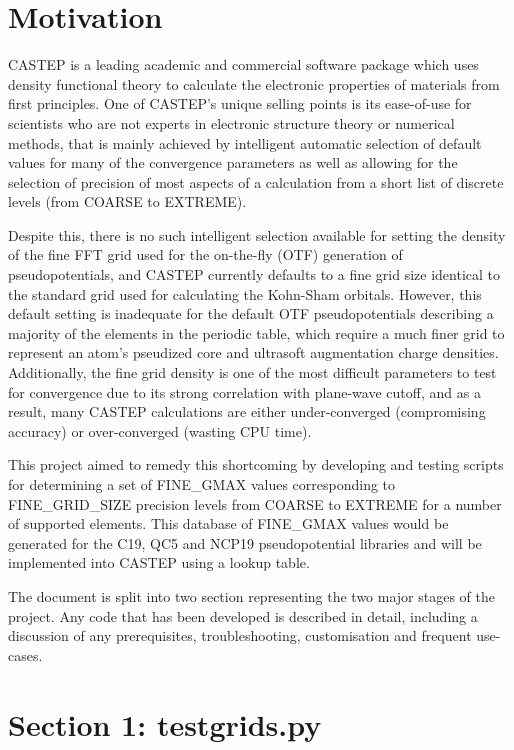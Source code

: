 \section{Motivation}

CASTEP is a leading academic and commercial software package which uses density functional theory to calculate the electronic properties of materials from first principles. One of CASTEP's unique selling points is its ease-of-use for scientists who are not experts in electronic structure theory or numerical methods, that is mainly achieved by intelligent automatic selection of default values for many of the convergence parameters as well as allowing for the selection of precision of most aspects of a calculation from a short list of discrete levels (from COARSE to EXTREME).

Despite this, there is no such intelligent selection available for setting the density of the fine FFT grid used for the on-the-fly (OTF) generation of pseudopotentials, and CASTEP currently defaults to a fine grid size identical to the standard grid used for calculating the Kohn-Sham orbitals. However, this default setting is inadequate for the default OTF pseudopotentials describing a majority of the elements in the periodic table, which require a much finer grid to represent an atom's pseudized core and ultrasoft augmentation charge densities. Additionally, the fine grid density is one of the most difficult parameters to test for convergence due to its strong correlation with plane-wave cutoff, and as a result, many CASTEP calculations are either under-converged (compromising accuracy) or over-converged (wasting CPU time).

This project aimed to remedy this shortcoming by developing and testing scripts for determining a set of FINE\_GMAX values corresponding to FINE\_GRID\_SIZE precision levels from COARSE to EXTREME for a number of supported elements. This database of FINE\_GMAX values would be generated for the C19, QC5 and NCP19 pseudopotential libraries and will be implemented into CASTEP using a lookup table.

The document is split into two section representing the two major stages of the project. Any code that has been developed is described in detail, including a discussion of any prerequisites, troubleshooting, customisation and frequent use-cases.

\section{Section 1: testgrids.py}

